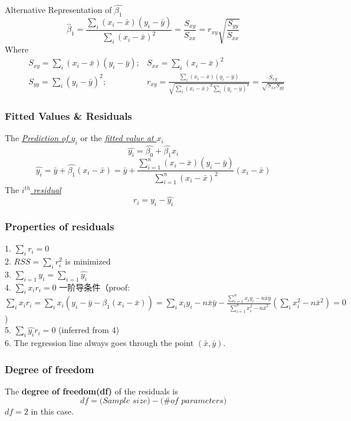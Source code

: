 \documentclass[11pt,a4paper]{article}
\begin{document}
Alternative Representation of $\hat{\beta_1}$
$$\hat{\beta}_{1}=\frac{\sum_{i}\left(x_{i}-\bar{x}\right)\left(y_{i}-\bar{y}\right)}{\sum_{i}\left(x_{i}-\bar{x}\right)^{2}}=\frac{S_{x y}}{S_{x x}}=r_{x y} \sqrt{\frac{S_{y y}}{S_{x x}}}$$
Where 
\begin{equation}
    \begin{aligned}
        &S_{xy}=\sum_{i}\left(x_{i}-\bar{x}\right)\left(y_{i}-\bar{y}\right); &S_{xx}=\sum_{i}\left(x_{i}-\bar{x}\right)^{2}\\
        &S_{yy}=\sum_{i}\left(y_{i}-\bar{y}\right)^{2}; &r_{xy}=\frac{\sum_{i}\left(x_{i}-\bar{x}\right)\left(y_{i}-\bar{y}\right)}{\sqrt{\sum_{i}\left(x_{i}-\bar{x}\right)^{2}\sum_{i}\left(y_{i}-\bar{y}\right)^{2}}}=\frac{S_{xy}}{\sqrt{S_{xx}S_{yy}}}
    \end{aligned}
    \nonumber
\end{equation}

\subsubsection{Fitted Values \& Residuals}
The \underline{\textit{Prediction of $y_i$}} or the \underline{\textit{fitted value at $x_i$}}
$$\hat{y_i}=\hat{\beta_0}+\hat{\beta_1}x_i$$
$$\hat{y_i}=\bar{y}+\hat{\beta_1}(x_i-\bar{x})=\bar{y}+\frac{\sum_{i=1}^{n}\left(x_{i}-\bar{x}\right)\left(y_{i}-\bar{y}\right)}{\sum_{i=1}^{n}\left(x_{i}-\bar{x}\right)^{2}}(x_i-\bar{x})$$
The \underline{\textit{$i^{th}$ residual}}
$$r_i=y_i-\hat{y_i}$$

\subsubsection{Properties of residuals}
1. $\sum_i r_i=0$\\
2. $RSS=\sum_i r_i^2$ is minimized\\
3. $\sum_{i=1}y_i=\sum_{i=1}\hat{y_i}$\\
4. $\sum_ix_ir_i=0$ 一阶导条件（proof: $\sum_ix_ir_i=\sum_ix_i(y_i-\bar{y}-\hat{\beta_1}(x_i-\bar{x}))=\sum_ix_iy_i-n\bar{x}\bar{y}-\frac{\sum_{i=1}^{n} x_{i} y_{i}-n \bar{x} \bar{y}}{\sum_{i=1}^{n} x_{i}^{2}-n \bar{x}^{2}}(\sum_ix_i^2-n\bar{x}^2)=0$)\\
5. $\sum_i \hat{y_i} r_i=0$ (inferred from 4)\\
6. The regression line always goes through the point $(\bar{x},\bar{y})$.

\subsubsection{Degree of freedom}
The \textbf{degree of freedom(df)} of the residuals is
$$df=\textit{(Sample size)}-\textit{(\# of parameters)}$$
$df=2$ in this case.
\end{document}
